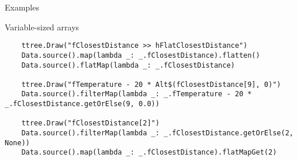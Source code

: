 \documentclass{beamer}
\begin{document}
\begin{frame}[fragile]{Examples}
\begin{block}{Variable-sized arrays}
\vspace{-0.5\baselineskip}
{\scriptsize \begin{verbatim}
    ttree.Draw("fClosestDistance >> hFlatClosestDistance")
    Data.source().map(lambda _: _.fClosestDistance).flatten()
    Data.source().flatMap(lambda _: _.fClosestDistance)

    ttree.Draw("fTemperature - 20 * Alt$(fClosestDistance[9], 0)")
    Data.source().filterMap(lambda _: _.fTemperature - 20 * _.fClosestDistance.getOrElse(9, 0.0))

    ttree.Draw("fClosestDistance[2]")
    Data.source().filterMap(lambda _: _.fClosestDistance.getOrElse(2, None))
    Data.source().map(lambda _: _.fClosestDistance).flatMapGet(2)
\end{verbatim}}
\vspace{-0.5\baselineskip}
\end{block}
\end{frame}









\end{document}
